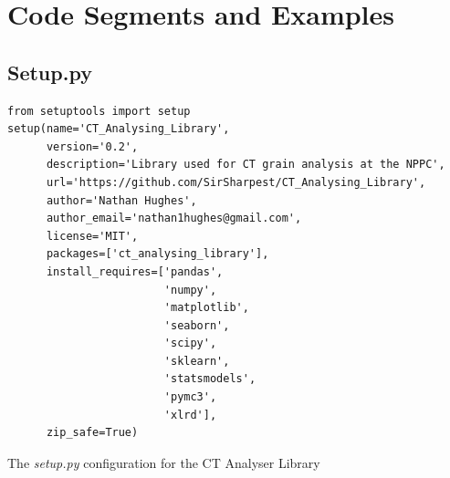 \documentclass[11pt]{report}
\begin{document}
\clearpage
\chapter{Code Segments and Examples}
\label{sec:orgb9b9e48}

\section{Setup.py}
\label{sec:orge48d769}
\begin{listing}[htbp]
\begin{verbatim}
from setuptools import setup
setup(name='CT_Analysing_Library',
      version='0.2',
      description='Library used for CT grain analysis at the NPPC',
      url='https://github.com/SirSharpest/CT_Analysing_Library',
      author='Nathan Hughes',
      author_email='nathan1hughes@gmail.com',
      license='MIT',
      packages=['ct_analysing_library'],
      install_requires=['pandas',
                        'numpy',
                        'matplotlib',
                        'seaborn',
                        'scipy',
                        'sklearn',
                        'statsmodels',
                        'pymc3',
                        'xlrd'],
      zip_safe=True)
\end{verbatim}
\caption{\label{org39ea4a7}
The \emph{setup.py} configuration for the CT Analyser Library}
\end{listing}

\clearpage
\end{document}
